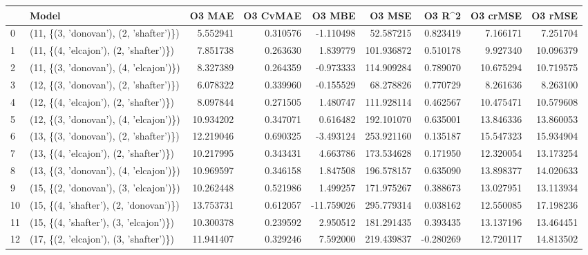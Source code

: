 \begin{tabular}{llrrrrrrr}
\toprule
{} &                                   Model &     O3 MAE &  O3 CvMAE &     O3 MBE &      O3 MSE &    O3 R\textasciicircum2 &   O3 crMSE &    O3 rMSE \\
\midrule
0  &  (11, \{(3, 'donovan'), (2, 'shafter')\}) &   5.552941 &  0.310576 &  -1.110498 &   52.587215 &  0.823419 &   7.166171 &   7.251704 \\
1  &  (11, \{(4, 'elcajon'), (2, 'shafter')\}) &   7.851738 &  0.263630 &   1.839779 &  101.936872 &  0.510178 &   9.927340 &  10.096379 \\
2  &  (11, \{(3, 'donovan'), (4, 'elcajon')\}) &   8.327389 &  0.264359 &  -0.973333 &  114.909284 &  0.789070 &  10.675294 &  10.719575 \\
3  &  (12, \{(3, 'donovan'), (2, 'shafter')\}) &   6.078322 &  0.339960 &  -0.155529 &   68.278826 &  0.770729 &   8.261636 &   8.263100 \\
4  &  (12, \{(4, 'elcajon'), (2, 'shafter')\}) &   8.097844 &  0.271505 &   1.480747 &  111.928114 &  0.462567 &  10.475471 &  10.579608 \\
5  &  (12, \{(3, 'donovan'), (4, 'elcajon')\}) &  10.934202 &  0.347071 &   0.616482 &  192.101070 &  0.635001 &  13.846336 &  13.860053 \\
6  &  (13, \{(3, 'donovan'), (2, 'shafter')\}) &  12.219046 &  0.690325 &  -3.493124 &  253.921160 &  0.135187 &  15.547323 &  15.934904 \\
7  &  (13, \{(4, 'elcajon'), (2, 'shafter')\}) &  10.217995 &  0.343431 &   4.663786 &  173.534628 &  0.171950 &  12.320054 &  13.173254 \\
8  &  (13, \{(3, 'donovan'), (4, 'elcajon')\}) &  10.969597 &  0.346158 &   1.847508 &  196.578157 &  0.635090 &  13.898377 &  14.020633 \\
9  &  (15, \{(2, 'donovan'), (3, 'elcajon')\}) &  10.262448 &  0.521986 &   1.499257 &  171.975267 &  0.388673 &  13.027951 &  13.113934 \\
10 &  (15, \{(4, 'shafter'), (2, 'donovan')\}) &  13.753731 &  0.612057 & -11.759026 &  295.779314 &  0.038162 &  12.550085 &  17.198236 \\
11 &  (15, \{(4, 'shafter'), (3, 'elcajon')\}) &  10.300378 &  0.239592 &   2.950512 &  181.291435 &  0.393435 &  13.137196 &  13.464451 \\
12 &  (17, \{(2, 'elcajon'), (3, 'shafter')\}) &  11.941407 &  0.329246 &   7.592000 &  219.439837 & -0.280269 &  12.720117 &  14.813502 \\

\end{tabular}
